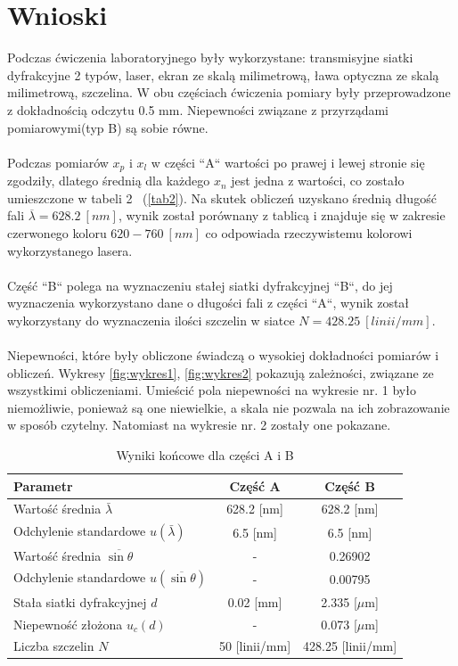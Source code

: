 \documentclass{article}
\begin{document}
\section{Wnioski}
\label{wnioski}
Podczas ćwiczenia laboratoryjnego były wykorzystane: transmisyjne siatki dyfrakcyjne 2 typów, laser, ekran ze skalą milimetrową, ława optyczna ze skalą milimetrową, szczelina.
W obu częściach ćwiczenia pomiary były przeprowadzone z dokładnością odczytu 0.5 mm. Niepewności związane z przyrządami pomiarowymi(typ B) są sobie równe. \\ \\
Podczas pomiarów \(x_{p}\) i \(x_{l}\) w części “A“ wartości po prawej i lewej stronie się zgodziły, dlatego średnią dla każdego \(x_n\) jest jedna z wartości, co zostało umieszczone w tabeli 2 \ (\cref{tab2}). Na skutek obliczeń uzyskano średnią długość fali \(\overline{\lambda}= 628.2 \ [nm]\), wynik został porównany z tablicą \cite[str. 219]{Tabf} i znajduje się w zakresie czerwonego koloru \(620-760\ [nm]\) co odpowiada rzeczywistemu kolorowi wykorzystanego lasera. \\ \\ 
Część “B“ polega na wyznaczeniu stałej siatki dyfrakcyjnej “B“, do jej wyznaczenia wykorzystano dane o długości fali z części “A“, wynik został wykorzystany do wyznaczenia ilości szczelin w siatce \(N= 428.25 \ [linii/mm]\). \\ \\
Niepewności, które były obliczone świadczą o wysokiej dokładności pomiarów i obliczeń. Wykresy \cref{fig:wykres1}, \cref{fig:wykres2} pokazują zależności, związane ze wszystkimi obliczeniami. Umieścić pola niepewności na wykresie nr. 1 było niemożliwie, ponieważ są one niewielkie, a skala nie pozwala na ich zobrazowanie w sposób czytelny. Natomiast na wykresie nr. 2 zostały one pokazane.

\begin{table}[h]
    \centering
    \renewcommand{\arraystretch}{1.5}
    \begin{tabular}{|l|c|c|}
        \hline
        Parametr & Część A & Część B \\ \hline
        Wartość średnia $\bar{\lambda}$ & 628.2 [nm] & 628.2 [nm] \\ \hline
        Odchylenie standardowe $u(\bar{\lambda})$ & 6.5 [nm] & 6.5 [nm] \\ \hline
        Wartość średnia $\overline{\sin\theta}$ & - & 0.26902 \\ \hline
        Odchylenie standardowe $u(\overline{\sin\theta})$ & - & 0.00795 \\ \hline
        Stała siatki dyfrakcyjnej $d$ & 0.02 [mm]  & 2.335 [$\mu$m] \\ \hline
        Niepewność złożona $u_c(d)$ & - & 0.073 [$\mu$m] \\ \hline
        Liczba szczelin $N$ & 50 [linii/mm] & 428.25 [linii/mm] \\ \hline
    \end{tabular}
    \caption{Wyniki końcowe dla części A i B}
    \label{tab:wyniki}
\end{table}
\end{document}
